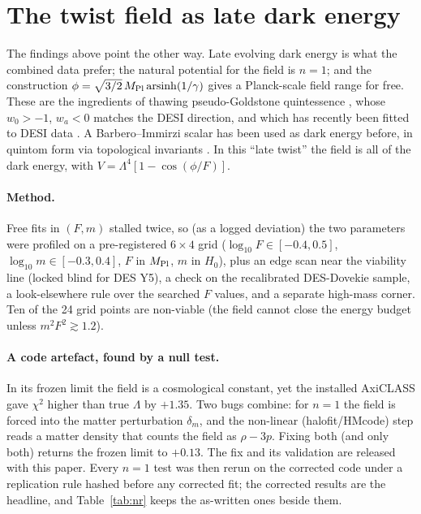 \documentclass[11pt]{article}
\newcommand{\Mp}{M_{\rm Pl}}
\begin{document}
\section{The twist field as late dark energy}\label{sec:late}
The findings above point the other way. Late evolving dark energy is what the combined data prefer; the natural
potential for the field is $n=1$; and the construction $\phi=\sqrt{3/2}\,\Mp\,{\rm arsinh}(1/\gamma)$ gives a
Planck-scale field range for free. These are the ingredients of thawing pseudo-Goldstone quintessence
\cite{frieman1995}, whose $w_0>-1$, $w_a<0$ matches the DESI direction, and which has recently been fitted to DESI
data \cite{lin2025}. A Barbero--Immirzi scalar has been used as dark energy before, in quintom form via topological
invariants \cite{pollari2023}. In this ``late twist'' the field is all of the dark energy, with $V=\Lambda^4[1-\cos(\phi/F)]$.

\paragraph{Method.} Free fits in $(F,m)$ stalled twice, so (as a logged deviation) the two parameters were profiled
on a pre-registered $6\times4$ grid ($\log_{10}F\in[-0.4,0.5]$, $\log_{10}m\in[-0.3,0.4]$, $F$ in $\Mp$, $m$ in $H_0$),
plus an edge scan near the viability line (locked blind for DES Y5), a check on the recalibrated DES-Dovekie sample,
a look-elsewhere rule over the searched $F$ values, and a separate high-mass corner. Ten of the 24 grid points are
non-viable (the field cannot close the energy budget unless $m^2F^2\gtrsim1.2$).

\paragraph{A code artefact, found by a null test.} In its frozen limit the field is a cosmological constant, yet the
installed AxiCLASS gave $\chi^2$ higher than true $\Lambda$ by $+1.35$. Two bugs combine: for $n=1$ the field is
forced into the matter perturbation $\delta_m$, and the non-linear (halofit/HMcode) step reads a matter density that
counts the field as $\rho-3p$. Fixing both (and only both) returns the frozen limit to $+0.13$. The fix and its
validation are released with this paper. Every $n=1$ test was then rerun on the corrected code under a replication
rule hashed before any corrected fit; the corrected results are the headline, and Table~\ref{tab:nr} keeps the
as-written ones beside them.
\end{document}

